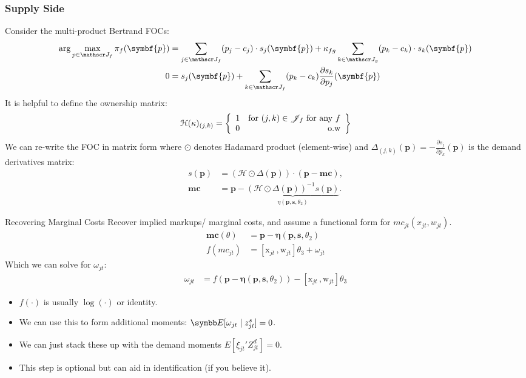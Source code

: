 \documentclass[aspectratio=169,10pt]{beamer}
\begin{document}
\begin{frame}[plain]
\frametitle{Supply Side}
Consider the multi-product Bertrand FOCs:
{\footnotesize \begin{align*}
\arg \max_{p \in \calJ_f} \pi_f (\symbf{p}) &= \sum_{j \in \calJ_f} (p_j - c_j) \cdot s_j(\symbf{p}) +  \kappa_{fg}\sum_{k \in \calJ_g} (p_k - c_k) \cdot s_k(\symbf{p}) \\
0&= s_j(\symbf{p}) + \sum_{k \in \calJ_f} (p_k - c_k) \frac{\partial s_{k}}{\partial p_j}(\symbf{p}) 
\end{align*}
}
It is helpful to define the \alert{ownership matrix}:
\begin{align*}
\mathcal{H}(\kappa)_{(j,k)} = \left\{\begin{array}{lr}
          1 & \text{for }  (j,k) \in \mathscr{J}_f \text{ for any } f \\ 
      0 & \text{o.w}\\
        \end{array} \right\}
\end{align*}
We can re-write the FOC in matrix form where $\odot$ denotes Hadamard product (element-wise) and  $\Delta_{(j,k)}(\symbf{p})  = - \frac{\partial s_{j}}{\partial p_k}(\symbf{p})$ is the demand derivatives matrix:
\begin{align*}
        s(\symbf{p}) &= (\mathcal{H} \odot \Delta(\symbf{p})) \cdot (\symbf{p} - \symbf{mc}), \\
       \symbf{mc} &=  \symbf{p} - \underbrace{(\mathcal{H} \odot \Delta(\symbf{p}))^{-1} s(\symbf{p})}_{\eta(\symbf{p},\symbf{s},\theta_2)}.
\end{align*}
\end{frame}



\begin{frame}{Recovering Marginal Costs }
Recover implied markups/ marginal costs, and assume a functional form for $mc_{jt}(x_{jt},w_{jt})$.
\begin{align*}
\symbf{mc}(\theta)&= \symbf{p}- \symbf{\eta}(\symbf{p},\symbf{s},\theta_2)\\
f(mc_{jt}) &= [\textrm{x}_{jt} \,, \textrm{w}_{jt}] \theta_3 + \omega_{jt}
\end{align*}
Which we can solve for $\omega_{jt}$:
\begin{align*}
\omega_{jt} &=  f(\symbf{p}- \symbf{\eta}(\symbf{p},\symbf{s},\theta_2) ) -[\textrm{x}_{jt} \,, \textrm{w}_{jt}] \theta_3 
\end{align*}
\begin{itemize}
\item $f(\cdot)$ is usually $\log(\cdot)$ or identity.
\item We can use this to form additional moments: $\E[\omega_{jt} \mid  z_{jt}^{s}]=0$.
\item We can just stack these up with the demand moments $E[\xi_{jt}' Z_{jt}^d]=0$.
\item This step is optional but can aid in identification (if you believe it).
\end{itemize}
\end{frame}
\end{document}
